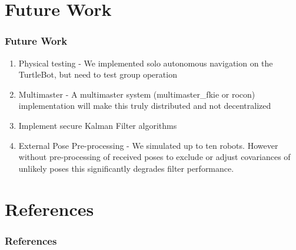 \documentclass[14pt]{beamer}
\begin{document}
\section{Future Work}
\begin{frame}
\frametitle{Future Work}
\begin{enumerate}
\item Physical testing - We implemented solo autonomous navigation on the TurtleBot, but need to test group operation
\pause
\item Multimaster - A multimaster system (multimaster\_fkie or rocon) implementation will make this truly distributed and not decentralized
\pause
\item Implement secure Kalman Filter algorithms
\pause
\item External Pose Pre-processing - We simulated up to ten robots. However without pre-processing of received poses to exclude or adjust covariances of unlikely poses this significantly degrades filter performance.
\end{enumerate}
\end{frame}

\section{References}
\begin{frame}[allowframebreaks]
\frametitle{References}
\printbibliography
\end{frame}
\end{document}
